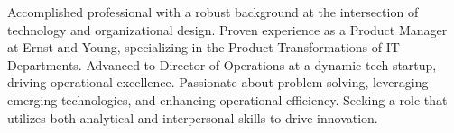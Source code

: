 

\begin{cvparagraph}

Accomplished professional with a robust background at the intersection of technology and organizational design. Proven experience as a Product Manager at Ernst and Young, specializing in the Product Transformations of IT Departments. Advanced to Director of Operations at a dynamic tech startup, driving operational excellence. Passionate about problem-solving, leveraging emerging technologies, and enhancing operational efficiency. Seeking a role that utilizes both analytical and interpersonal skills to drive innovation.
\end{cvparagraph}
